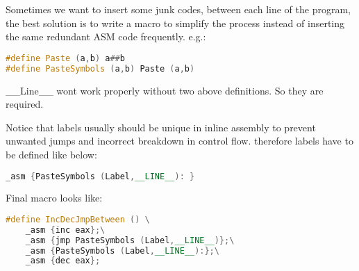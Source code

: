 \begin{note}\label{ntInlineAsmMacro}

Sometimes we want to insert some junk codes, between each line of the program, the best solution is to write a macro to simplify the process instead of inserting the same redundant ASM code frequently. e.g.:

\begin{lstlisting}[language={c++}]
#define Paste (a,b) a##b
#define PasteSymbols (a,b) Paste (a,b)
\end{lstlisting}
\_\_Line\_\_ wont work properly without two above definitions. So they are required.

\begin{remark}
Notice that labels usually should be unique in inline assembly to prevent unwanted jumps and incorrect breakdown in control flow. therefore labels have to be defined like below:
\begin{lstlisting}[language={c++}]
_asm {PasteSymbols (Label,__LINE__): }
\end{lstlisting}
\end{remark}
Final macro looks like:
\begin{lstlisting}[language={c++}]
#define IncDecJmpBetween () \
	_asm {inc eax};\
	_asm {jmp PasteSymbols (Label,__LINE__)};\
	_asm {PasteSymbols (Label,__LINE__):};\
	_asm {dec eax};
\end{lstlisting}
\end{note}


